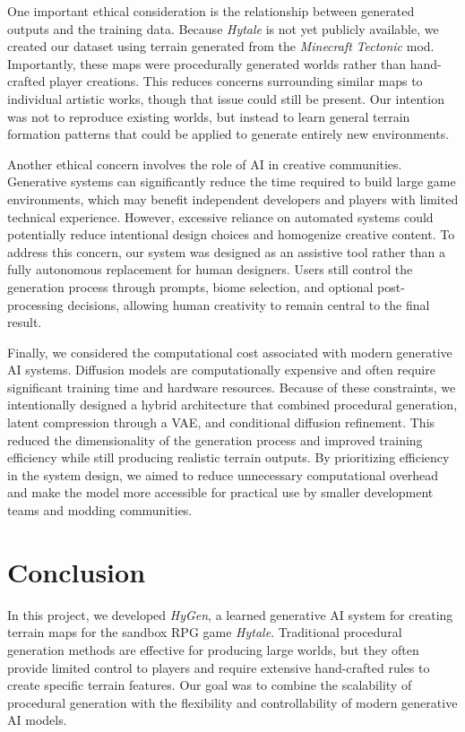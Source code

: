 \documentclass[conference]{IEEEtran}
\begin{document}
One important ethical consideration is the relationship between generated outputs and the training data. Because \textit{Hytale} is not yet publicly available, we created our dataset using terrain generated from the \textit{Minecraft} \textit{Tectonic} mod. Importantly, these maps were procedurally generated worlds rather than hand-crafted player creations. This reduces concerns surrounding similar maps to individual artistic works, though that issue could still be present. Our intention was not to reproduce existing worlds, but instead to learn general terrain formation patterns that could be applied to generate entirely new environments.

Another ethical concern involves the role of AI in creative communities. Generative systems can significantly reduce the time required to build large game environments, which may benefit independent developers and players with limited technical experience. However, excessive reliance on automated systems could potentially reduce intentional design choices and homogenize creative content. To address this concern, our system was designed as an assistive tool rather than a fully autonomous replacement for human designers. Users still control the generation process through prompts, biome selection, and optional post-processing decisions, allowing human creativity to remain central to the final result.

Finally, we considered the computational cost associated with modern generative AI systems. Diffusion models are computationally expensive and often require significant training time and hardware resources. Because of these constraints, we intentionally designed a hybrid architecture that combined procedural generation, latent compression through a VAE, and conditional diffusion refinement. This reduced the dimensionality of the generation process and improved training efficiency while still producing realistic terrain outputs. By prioritizing efficiency in the system design, we aimed to reduce unnecessary computational overhead and make the model more accessible for practical use by smaller development teams and modding communities.

\section{Conclusion}

In this project, we developed \textit{HyGen}, a learned generative AI system for creating terrain maps for the sandbox RPG game \textit{Hytale}. Traditional procedural generation methods are effective for producing large worlds, but they often provide limited control to players and require extensive hand-crafted rules to create specific terrain features. Our goal was to combine the scalability of procedural generation with the flexibility and controllability of modern generative AI models.
\end{document}

